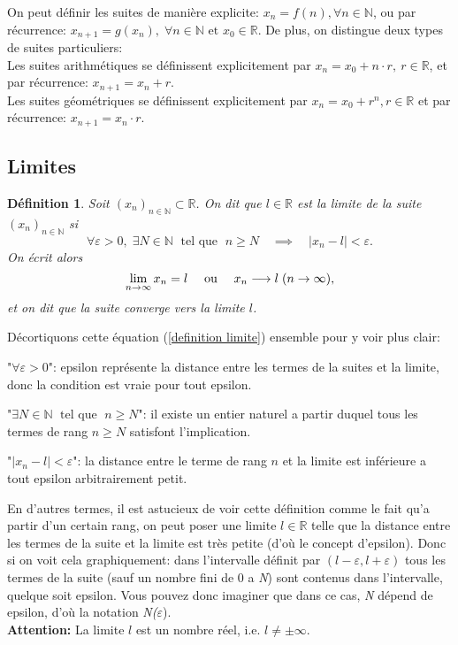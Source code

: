 \documentclass[a4paper, 12pt, french, twoside]{article}
\newtheorem{defi}[theorem]{Définition}
\newcommand{\Nn}{{\mathbb{N}}}
\newcommand{\Rr}{{\mathbb{R}}}
\begin{document}
On peut définir les suites de manière explicite: 
$x_n=f(n), \forall n\in\Nn$, ou par récurrence:
$ x_{n+1}=g(x_n), \; \forall n \in \Nn \text{ et } x_0 \in \Rr$.
De plus, on distingue deux types de suites particuliers:
\\Les suites arithmétiques se définissent explicitement par $x_n=x_0+n\cdot r, ~r\in\Rr$, et par récurrence: $x_{n+1}=x_n+r$.
\\Les suites géométriques se définissent explicitement par 
$x_n=x_0+r^n, r\in\Rr$ et par récurrence: $x_{n+1}=x_n\cdot r$.



\subsection{Limites}
\begin{defi}
Soit $(x_n)_{n\in\Nn}\subset \Rr$. On dit que $l\in \Rr$ est la \textit{limite} de la suite  $(x_n)_{n\in\Nn}$ si 
\begin{equation}\label{definition limite}
    \forall \varepsilon>0, \; \exists N\in\Nn \; \text{ tel que } \; n\geq N \quad \implies \quad |x_n-l|<\varepsilon.
\end{equation}
On écrit alors 
\begin{equation*}
    \lim_{n\to\infty} x_n= l \text{ \quad ou \quad } x_n\longrightarrow l \; (n \rightarrow \infty),
\end{equation*}
et on dit que la suite \textit{converge} vers la limite $l$.     
\end{defi}
Décortiquons cette équation (\ref{definition limite}) ensemble pour y voir plus clair: 

"$\forall \varepsilon>0$": epsilon représente la distance entre les termes de la suites et la limite, donc la condition est vraie pour tout epsilon.

"$\exists N\in\Nn \; \text{ tel que } \; n\geq N$": il existe un entier naturel a partir duquel tous les termes de rang $n\geq N$ satisfont l'implication.

"$|x_n-l|<\varepsilon$": la distance entre le terme de rang $n$ et la limite est inférieure a tout epsilon arbitrairement petit.

En d'autres termes, il est astucieux de voir cette définition comme le fait qu'a partir d'un certain rang, on peut poser une limite $l\in\Rr$ telle que la distance entre les termes de la suite et la limite est très petite (d'où le concept d'epsilon).
Donc si on voit cela graphiquement: dans l'intervalle définit par $(l-\varepsilon,l+\varepsilon)$ tous les termes de la suite (sauf un nombre fini de 0 a \textit{N}) sont contenus dans l'intervalle, quelque soit epsilon.
Vous pouvez donc imaginer que dans ce cas, \textit{N} dépend de epsilon, d'où la notation \textit{N(}$\varepsilon$).
\\\textbf{Attention: } La limite $l$ est un nombre réel, i.e. $l\neq\pm\infty$. 
\end{document}

